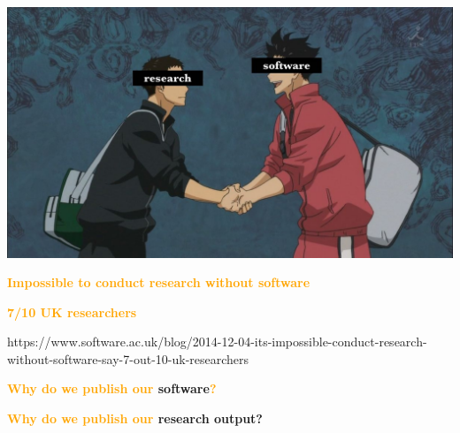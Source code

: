 \documentclass{beamer}
\begin{document}
\begin{frame}
    \begin{center}
    \includegraphics[width=\textwidth]{static/research_and_software.jpg}\hspace{8pt}
    \end{center}
\end{frame}

\begin{frame}
    \centering
    \Large{\textbf{\textcolor{orange}{Impossible to conduct research without software}}} \\
    \vspace{.3cm}

    \LARGE{\textbf{\textcolor{orange}{7/10 UK researchers}}}
    \vspace{2cm}

    \tiny{https://www.software.ac.uk/blog/2014-12-04-its-impossible-conduct-research-without-software-say-7-out-10-uk-researchers}
\end{frame}

\begin{frame}
    \centering
    \Large{\textbf{\textcolor{orange}{Why do we publish our} software\textcolor{orange}{?}}}
\end{frame}



\begin{frame}
    \centering
    \Large{\textbf{\textcolor{orange}{Why do we publish our} research output?}}
\end{frame}

\end{document}
